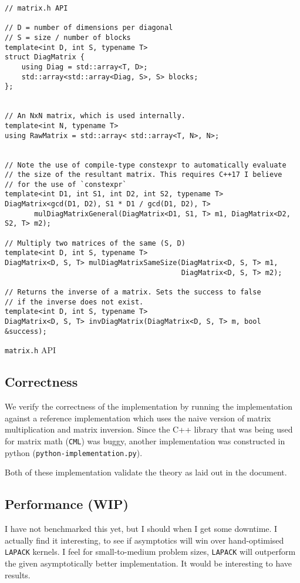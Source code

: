 \documentclass[11pt]{article}
\begin{document}
\begin{listing}
\begin{verbatim}
// matrix.h API

// D = number of dimensions per diagonal
// S = size / number of blocks
template<int D, int S, typename T>
struct DiagMatrix {
    using Diag = std::array<T, D>;
    std::array<std::array<Diag, S>, S> blocks;
};


// An NxN matrix, which is used internally.
template<int N, typename T>
using RawMatrix = std::array< std::array<T, N>, N>;


// Note the use of compile-type constexpr to automatically evaluate
// the size of the resultant matrix. This requires C++17 I believe
// for the use of `constexpr`
template<int D1, int S1, int D2, int S2, typename T>
DiagMatrix<gcd(D1, D2), S1 * D1 / gcd(D1, D2), T> 
       mulDiagMatrixGeneral(DiagMatrix<D1, S1, T> m1, DiagMatrix<D2, S2, T> m2);

// Multiply two matrices of the same (S, D)
template<int D, int S, typename T>
DiagMatrix<D, S, T> mulDiagMatrixSameSize(DiagMatrix<D, S, T> m1, 
                                          DiagMatrix<D, S, T> m2);

// Returns the inverse of a matrix. Sets the success to false
// if the inverse does not exist.
template<int D, int S, typename T>
DiagMatrix<D, S, T> invDiagMatrix(DiagMatrix<D, S, T> m, bool &success);
\end{verbatim}
\caption{\texttt{matrix.h} API}
\label{matrixhapi}
\end{listing}
\subsection{Correctness}
We verify the correctness of the implementation by running the implementation
against a reference implementation which uses the naive version of matrix
multiplication and matrix inversion. Since the C++ library that was being used
for matrix math ({\texttt{CML}}) was buggy, another implementation
was constructed in python (\texttt{python-implementation.py}). 

Both of these implementation validate the theory as laid out in the document.

\subsection{Performance (WIP)}
I have not benchmarked this yet, but I should when I get some downtime. I 
actually find it interesting, to see if asymptotics will win over hand-optimised
\texttt{LAPACK} kernels. I feel for small-to-medium problem sizes,
\texttt{LAPACK} will outperform the given asymptotically better implementation.
It would be interesting to have results.
\end{document}

